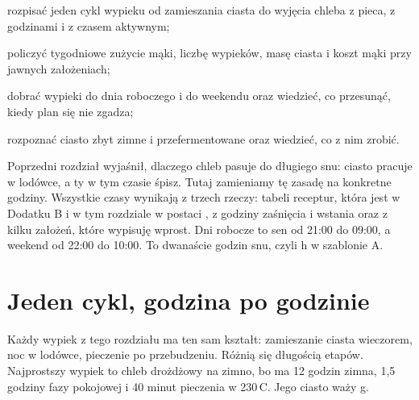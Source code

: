 
\begin{cele}
\item rozpisać jeden cykl wypieku od zamieszania ciasta do wyjęcia chleba z pieca, z godzinami i z czasem aktywnym;
\item policzyć tygodniowe zużycie mąki, liczbę wypieków, masę ciasta i koszt mąki przy jawnych założeniach;
\item dobrać wypieki do dnia roboczego i do weekendu oraz wiedzieć, co przesunąć, kiedy plan się nie zgadza;
\item rozpoznać ciasto zbyt zimne i przefermentowane oraz wiedzieć, co z nim zrobić.
\end{cele}

Poprzedni rozdział wyjaśnił, dlaczego chleb pasuje do długiego snu: ciasto pracuje w lodówce, a ty w tym czasie śpisz. Tutaj zamieniamy tę zasadę na konkretne godziny. Wszystkie czasy wynikają z trzech rzeczy: tabeli receptur, która jest w Dodatku B i w tym rozdziale w postaci , z godziny zaśnięcia i wstania oraz z kilku założeń, które wypisuję wprost. Dni robocze to sen od 21:00 do 09:00, a weekend od 22:00 do 10:00. To dwanaście godzin snu, czyli  h w szablonie A.

\section{Jeden cykl, godzina po godzinie}

Każdy wypiek z tego rozdziału ma ten sam kształt: zamieszanie ciasta wieczorem, noc w lodówce, pieczenie po przebudzeniu. Różnią się długością etapów. Najprostszy wypiek to chleb drożdżowy na zimno, bo ma 12 godzin zimna, 1,5 godziny fazy pokojowej i 40 minut pieczenia w 230\,\textdegree{}C. Jego ciasto waży  g.

